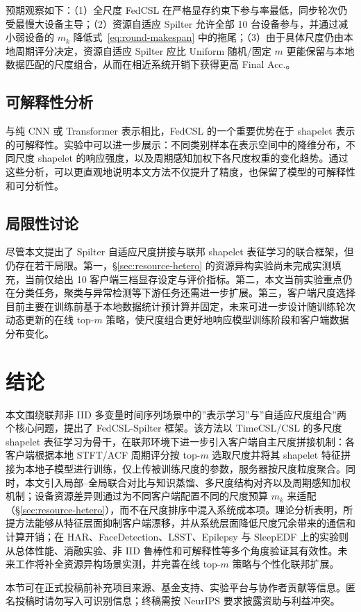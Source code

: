 \documentclass{article}
\begin{document}
预期观察如下：（1）全尺度 FedCSL 在严格显存约束下参与率最低，同步轮次仍受最慢大设备主导；（2）资源自适应 Spilter 允许全部 10 台设备参与，并通过减小弱设备的 $m_k$ 降低式~\eqref{eq:round-makespan} 中的拖尾；（3）由于具体尺度仍由本地周期评分决定，资源自适应 Spilter 应比 Uniform 随机/固定 $m$ 更能保留与本地数据匹配的尺度组合，从而在相近系统开销下获得更高 Final Acc.。

\subsection{可解释性分析}

与纯 CNN 或 Transformer 表示相比，FedCSL 的一个重要优势在于 shapelet 表示的可解释性。实验中可以进一步展示：不同类别样本在表示空间中的降维分布，不同尺度 shapelet 的响应强度，以及周期感知加权下各尺度权重的变化趋势。通过这些分析，可以更直观地说明本文方法不仅提升了精度，也保留了模型的可解释性和可分析性。

\subsection{局限性讨论}

尽管本文提出了 Spilter 自适应尺度拼接与联邦 shapelet 表征学习的联合框架，但仍存在若干局限。第一，§\ref{sec:resource-hetero} 的资源异构实验尚未完成实测填充，当前仅给出 10 客户端三档显存设定与评价指标。第二，本文当前实验重点仍在分类任务，聚类与异常检测等下游任务还需进一步扩展\cite{ts2vec,timescsl}。第三，客户端尺度选择目前主要在训练前基于本地数据统计预计算并固定，未来可进一步设计随训练轮次动态更新的在线 top-$m$ 策略，使尺度组合更好地响应模型训练阶段和客户端数据分布变化。

\section{结论}

本文围绕联邦非 IID 多变量时间序列场景中的”表示学习”与”自适应尺度组合”两个核心问题，提出了 FedCSL-Spilter 框架。该方法以 TimeCSL/CSL 的多尺度 shapelet 表征学习为骨干，在联邦环境下进一步引入客户端自主尺度拼接机制：各客户端根据本地 STFT/ACF 周期评分按 top-$m$ 选取尺度并将其 shapelet 特征拼接为本地子模型进行训练，仅上传被训练尺度的参数，服务器按尺度粒度聚合。同时，本文引入局部--全局联合对比与知识蒸馏、多尺度结构对齐以及周期感知加权机制；设备资源差异则通过为不同客户端配置不同的尺度预算 $m_k$ 来适配（§\ref{sec:resource-hetero}），而不在尺度排序中混入系统成本项。理论分析表明，所提方法能够从特征层面抑制客户端漂移，并从系统层面降低尺度冗余带来的通信和计算开销；在 HAR、FaceDetection、LSST、Epilepsy 与 SleepEDF 上的实验则从总体性能、消融实验、非 IID 鲁棒性和可解释性等多个角度验证其有效性。未来工作将补全资源异构场景实测，并完善在线 top-$m$ 策略与个性化联邦扩展。


\begin{ack}
本节可在正式投稿前补充项目来源、基金支持、实验平台与协作者贡献等信息。匿名投稿时请勿写入可识别信息；终稿需按 NeurIPS 要求披露资助与利益冲突。
\end{ack}

{\small


}
\end{document}
